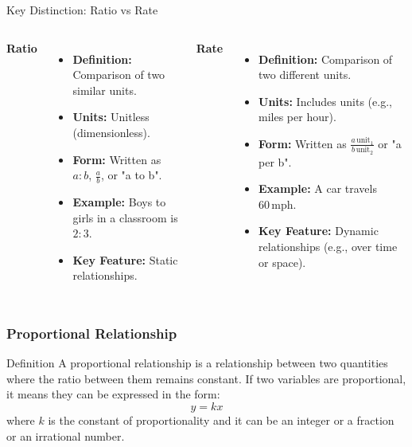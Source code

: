 \documentclass{beamer}
\begin{document}
\begin{frame}{Key Distinction: Ratio vs Rate}
    \begin{columns}[T] %
        \centering
        \textbf{Ratio}
        \begin{itemize}
            \item \textbf{Definition:} Comparison of two similar units.
            \item \textbf{Units:} Unitless (dimensionless).
            \item \textbf{Form:} Written as \( a:b \), \( \frac{a}{b} \), or "a to b".
            \item \textbf{Example:} Boys to girls in a classroom is \( 2:3 \).
            \item \textbf{Key Feature:} Static relationships.
        \end{itemize}

        \centering
        \textbf{Rate}
        \begin{itemize}
            \item \textbf{Definition:} Comparison of two different units.
            \item \textbf{Units:} Includes units (e.g., miles per hour).
            \item \textbf{Form:} Written as \( \frac{a \, \text{unit}_1}{b \, \text{unit}_2} \) or "a per b".
            \item \textbf{Example:} A car travels \( 60 \, \text{mph} \).
            \item \textbf{Key Feature:} Dynamic relationships (e.g., over time or space).
        \end{itemize}
    \end{columns}
\end{frame}


\begin{frame}
    \frametitle{Proportional Relationship}

    \begin{block}{Definition}
        A proportional relationship is a relationship between two quantities where the ratio between them remains constant. 
        If two variables are proportional, it means they can be expressed in the form:
        \[ y = kx \]
        where $ k $ is the constant of proportionality and it can be an integer or a fraction or an irrational number.
    \end{block}
\end{frame}
\end{document}
